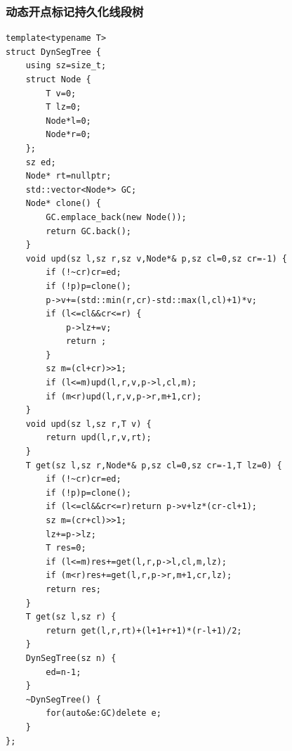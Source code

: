 \documentclass[UTF8,twoside]{ctexart}
\begin{document}
\subsubsection{动态开点标记持久化线段树}
\begin{lstlisting}
template<typename T>
struct DynSegTree {
    using sz=size_t;
    struct Node {
        T v=0;
        T lz=0;
        Node*l=0;
        Node*r=0;
    };
    sz ed;
    Node* rt=nullptr;
    std::vector<Node*> GC;
    Node* clone() {
        GC.emplace_back(new Node());
        return GC.back();
    }
    void upd(sz l,sz r,sz v,Node*& p,sz cl=0,sz cr=-1) {
        if (!~cr)cr=ed;
        if (!p)p=clone();
        p->v+=(std::min(r,cr)-std::max(l,cl)+1)*v;
        if (l<=cl&&cr<=r) {
            p->lz+=v;
            return ;
        }
        sz m=(cl+cr)>>1;
        if (l<=m)upd(l,r,v,p->l,cl,m);
        if (m<r)upd(l,r,v,p->r,m+1,cr);
    }
    void upd(sz l,sz r,T v) {
        return upd(l,r,v,rt);
    }
    T get(sz l,sz r,Node*& p,sz cl=0,sz cr=-1,T lz=0) {
        if (!~cr)cr=ed;
        if (!p)p=clone();
        if (l<=cl&&cr<=r)return p->v+lz*(cr-cl+1);
        sz m=(cr+cl)>>1;
        lz+=p->lz;
        T res=0;
        if (l<=m)res+=get(l,r,p->l,cl,m,lz);
        if (m<r)res+=get(l,r,p->r,m+1,cr,lz);
        return res;
    }
    T get(sz l,sz r) {
        return get(l,r,rt)+(l+1+r+1)*(r-l+1)/2;
    }
    DynSegTree(sz n) {
        ed=n-1;
    }
    ~DynSegTree() {
        for(auto&e:GC)delete e;
    }
};
\end{lstlisting}
\end{document}
